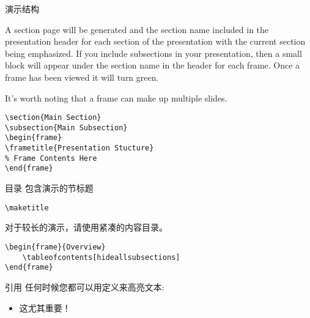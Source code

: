 \documentclass[newPxFont,sthlmFooter]{beamer}
\begin{document}
\begin{frame}[containsverbatim]{演示结构}

A section page will be generated and the section name included in the presentation header for each section of the presentation with the current section being emphasized.  If you include subsections in your presentation, then a small block will appear under the section name in the header for each frame.  Once a frame has been viewed it will turn green.

It's worth noting that a frame can make up multiple slides.

\begin{verbatim}
\section{Main Section}
\subsection{Main Subsection}
\begin{frame}
\frametitle{Presentation Stucture}
% Frame Contents Here
\end{frame}
\end{verbatim}
\end{frame}


\begin{frame}[containsverbatim]{目录}
包含演示的节标题
\begin{verbatim}
\maketitle
\end{verbatim}
对于较长的演示，请使用紧凑的内容目录。
\begin{verbatim}
\begin{frame}{Overview}
    \tableofcontents[hideallsubsections]
\end{frame}
\end{verbatim}
\end{frame}


\begin{frame}[containsverbatim]{引用}
任何时候您都可以用定义来高亮文本:
\begin{itemize}
	\item \alert{这尤其重要！}
\end{itemize}

\end{frame}
\end{document}
